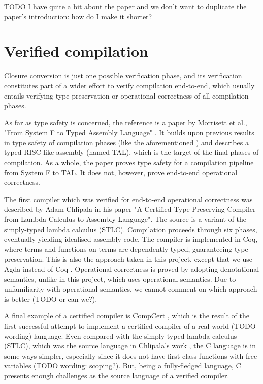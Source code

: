 \documentclass[bsc,frontabs,oneside,singlespacing,parskip,deptreport]{infthesis}
\theoremstyle{definition}
\begin{document}
TODO I have quite a bit about the paper and we don't want to duplicate
the paper's introduction: how do I make it shorter?

\section{Verified compilation}

Closure conversion is just one possible verification phase, and its
verification constitutes part of a wider effort to verify compilation
end-to-end, which usually entails verifying type preservation or
operational correctness of all compilation phases.

As far as type safety is concerned, the reference is a paper by
Morrisett et al., "From System F to Typed Assembly Language"
\cite{TODO}. It builds upon previous results in type safety of
compilation phases (like the aforementioned \cite{TCC}) and describes
a typed RISC-like assembly (named TAL), which is the target of the
final phases of compilation. As a whole, the paper proves type safety
for a compilation pipeline from System F to TAL. It does not, however,
prove end-to-end operational correctness.

The first compiler which was verified for end-to-end operational
correctness was described by Adam Chlipala in his paper "A Certified
Type-Preserving Compiler from Lambda Calculus to Assembly
Language". The source is a variant of the simply-typed lambda calculus
(STLC). Compilation proceeds through six phases, eventually yielding
idealised assembly code. The compiler is implemented in Coq, where
terms and functions on terms are dependently typed, guaranteeing type
preservation. This is also the approach taken in this project, except
that we use Agda instead of Coq \cite{TODO}. Operational
correctness is proved by adopting denotational semantics, unlike in
this project, which uses operational semantics. Due to unfamiliarity
with operational semantics, we cannot comment on which approach is
better (TODO or can we?).

A final example of a certified compiler is CompCert \cite{TODOcompcert}, which is the result of the first successful attempt to
implement a certified compiler of a real-world (TODO wording)
language. Even compared with the simply-typed lambda calculus (STLC),
which was the source language in Chlipala's work \cite{TODO}, the C
language is in some ways simpler, especially since it does not have
first-class functions with free variables (TODO wording:
scoping?). But, being a fully-fledged language, C presents enough
challenges as the source language of a verified compiler.
\end{document}
